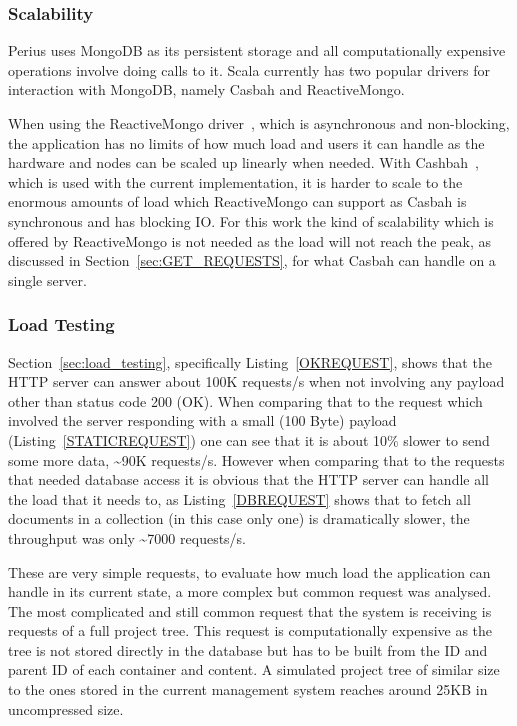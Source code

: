 \documentclass[a4paper,12pt]{article}
\begin{document}
\subsubsection{Scalability}
Perius uses MongoDB as its persistent storage and all computationally expensive operations involve
doing calls to it. Scala currently has two popular drivers for interaction with MongoDB, namely
Casbah and ReactiveMongo.

When using the ReactiveMongo driver~\cite{REACTIVEMONGO}, which is asynchronous and non-blocking, 
the application has no limits of how much load and users it can handle as the hardware and nodes 
can be scaled up linearly when needed. With Cashbah~\cite{CASBAH}, which is used with the current 
implementation, it is harder to scale to the enormous amounts of load which ReactiveMongo can 
support as Casbah is synchronous and has blocking IO. For this work the kind of scalability which 
is offered by ReactiveMongo is not needed as the load will not reach the peak, as discussed in 
Section~\ref{sec:GET_REQUESTS}, for what Casbah can handle on a single server. 

\subsubsection{Load Testing}
Section~\ref{sec:load_testing}, specifically Listing~\ref{OKREQUEST}, shows that the HTTP server can
answer about 100K requests/s when not involving any payload other than status code 200 (OK). When
comparing that to the request which involved the server responding with a small (100 Byte) payload
(Listing~\ref{STATICREQUEST}) one can see that it is about 10\% slower to send some more data,
\textasciitilde90K requests/s. However when comparing that to the requests that needed database
access it is obvious that the HTTP server can handle all the load that it needs to, as
Listing~\ref{DBREQUEST} shows that to fetch all documents in a collection (in this case only one) is
dramatically slower, the throughput was only \textasciitilde7000 requests/s. 

\par These are very simple requests, to evaluate how much load the application can handle in its
current state, a more complex but common request was analysed. The most complicated and still
common request that the system is receiving is requests of a full project tree. This request is
computationally expensive as the tree is not stored directly in the database but has to be built
from the ID and parent ID of each container and content. A simulated project tree of similar size to
the ones stored in the current management system reaches around 25KB in uncompressed size.
\end{document}
